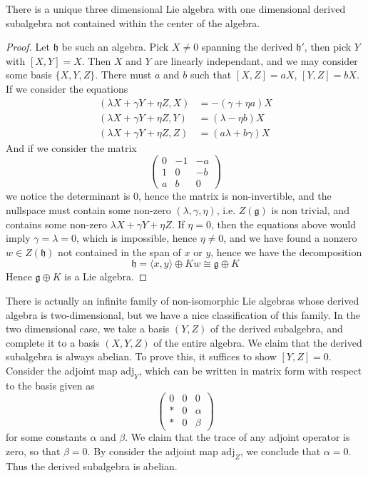 \begin{theorem}
    There is a unique three dimensional Lie algebra with one dimensional derived subalgebra not contained within the center of the algebra.
\end{theorem}
\begin{proof}
    Let $\mathfrak{h}$ be such an algebra. Pick $X \neq 0$ spanning the derived $\mathfrak{h}'$, then pick $Y$ with $[X,Y] = X$. Then $X$ and $Y$ are linearly independant, and we may consider some basis $\{ X, Y, Z \}$. There must $a$ and $b$ such that $[X,Z] = aX$, $[Y,Z] = bX$. If we consider the equations
    \begin{align*}
        (\lambda X + \gamma Y + \eta Z, X) &= -(\gamma + \eta a) X\\
        (\lambda X + \gamma Y + \eta Z, Y) &= (\lambda - \eta b) X\\
        (\lambda X + \gamma Y + \eta Z, Z) &= (a \lambda + b \gamma) X
    \end{align*}
    And if we consider the matrix
    \[ \begin{pmatrix} 0 & -1 & -a \\ 1 & 0 & -b \\ a & b & 0 \end{pmatrix} \]
    we notice the determinant is $0$, hence the matrix is non-invertible, and the nullspace must contain some non-zero $(\lambda, \gamma, \eta)$, i.e. $Z(\mathfrak{g})$ is non trivial, and contains some non-zero $\lambda X + \gamma Y + \eta Z$. If $\eta = 0$, then the equations above would imply $\gamma = \lambda = 0$, which is impossible, hence $\eta \neq 0$, and we have found a nonzero $w \in Z(\mathfrak{h})$ not contained in the span of $x$ or $y$, hence we have the decomposition
    \[ \mathfrak{h} = \langle x, y \rangle \oplus Kw \cong \mathfrak{g} \oplus K \]
    Hence $\mathfrak{g} \oplus K$ is a Lie algebra.
\end{proof}

There is actually an infinite family of non-isomorphic Lie algebras whose derived algebra is two-dimensional, but we have a nice classification of this family. In the two dimensional case, we take a basis $(Y,Z)$ of the derived subalgebra, and complete it to a basis $(X,Y,Z)$ of the entire algebra. We claim that the derived subalgebra is always abelian. To prove this, it suffices to show $[Y,Z] = 0$. Consider the adjoint map $\text{adj}_Y$, which can be written in matrix form with respect to the basis given as
%
\[ \begin{pmatrix} 0 & 0 & 0 \\ * & 0 & \alpha \\ * & 0 & \beta \end{pmatrix} \]
%
for some constants $\alpha$ and $\beta$. We claim that the trace of any adjoint operator is zero, so that $\beta = 0$. By consider the adjoint map $\text{adj}_Z$, we conclude that $\alpha = 0$. Thus the derived subalgebra is abelian.

